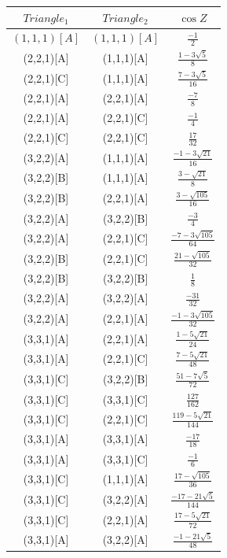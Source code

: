 \documentclass[11pt]{article}
\begin{document}
\begin{center}
\begin{tabular}{||c c c ||} 
 \hline
 $Triangle_1$ & $Triangle_2$ & $\cos{Z}$ \\ [0.5ex] 
 \hline\hline
$(1,1,1)[A]$ & $(1,1,1)[A]$ & $\frac{-1}{2}$\\
 \hline
(2,2,1)[A] & (1,1,1)[A] & $\frac{1-3\sqrt{5}}{8}$\\
(2,2,1)[C] & (1,1,1)[A] & $\frac{7-3\sqrt{5}}{16}$\\
(2,2,1)[A] & (2,2,1)[A] & $\frac{-7}{8}$\\
(2,2,1)[A] & (2,2,1)[C] & $\frac{-1}{4}$\\
(2,2,1)[C] & (2,2,1)[C] & $\frac{17}{32}$\\
 \hline
(3,2,2)[A] & (1,1,1)[A] & $\frac{-1-3\sqrt{21}}{16}$\\
(3,2,2)[B] & (1,1,1)[A] & $\frac{3-\sqrt{21}}{8}$\\
(3,2,2)[B] & (2,2,1)[A] & $\frac{3-\sqrt{105}}{16}$\\
(3,2,2)[A] & (3,2,2)[B] & $\frac{-3}{4}$\\
(3,2,2)[A] & (2,2,1)[C] & $\frac{-7-3\sqrt{105}}{64}$\\
(3,2,2)[B] & (2,2,1)[C] & $\frac{21-\sqrt{105}}{32}$\\
(3,2,2)[B] & (3,2,2)[B] & $\frac{1}{8}$\\
(3,2,2)[A] & (3,2,2)[A] & $\frac{-31}{32}$\\
(3,2,2)[A] & (2,2,1)[A] & $\frac{-1-3\sqrt{105}}{32}$\\
 \hline
(3,3,1)[A] & (2,2,1)[A] & $\frac{1-5\sqrt{21}}{24}$\\
(3,3,1)[A] & (2,2,1)[C] & $\frac{7-5\sqrt{21}}{48}$\\
(3,3,1)[C] & (3,2,2)[B] & $\frac{51-7\sqrt{5}}{72}$\\
(3,3,1)[C] & (3,3,1)[C] & $\frac{127}{162}$\\
(3,3,1)[C] & (2,2,1)[C] & $\frac{119-5\sqrt{21}}{144}$\\
(3,3,1)[A] & (3,3,1)[A] & $\frac{-17}{18}$\\
(3,3,1)[A] & (3,3,1)[C] & $\frac{-1}{6}$\\
(3,3,1)[C] & (1,1,1)[A] & $\frac{17-\sqrt{105}}{36}$\\
(3,3,1)[C] & (3,2,2)[A] & $\frac{-17-21\sqrt{5}}{144}$\\
(3,3,1)[C] & (2,2,1)[A] & $\frac{17-5\sqrt{21}}{72}$\\
(3,3,1)[A] & (3,2,2)[A] & $\frac{-1-21\sqrt{5}}{48}$\\

\end{tabular}
\end{center}
\end{document}
